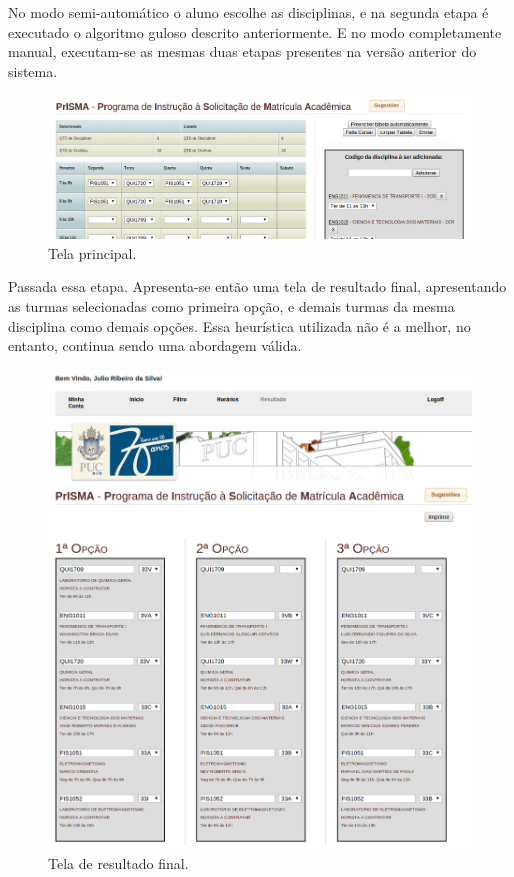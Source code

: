 \documentclass[graduacao,brazil]{ThesisPUC}
\begin{document}
No modo semi-automático o aluno escolhe as disciplinas, e na segunda etapa é executado o algoritmo guloso descrito anteriormente. E no modo completamente manual, executam-se as mesmas duas etapas presentes na versão anterior do sistema.

\begin{figure}[H]
    \centering
    \includegraphics[width=\linewidth]{img/v2_horario.png}
    \caption{Tela principal.}
\end{figure}

Passada essa etapa. Apresenta-se então uma tela de resultado final, apresentando as turmas selecionadas como primeira opção, e demais turmas da mesma disciplina como demais opções. Essa heurística utilizada não é a melhor, no entanto, continua sendo uma abordagem válida.

\begin{figure}[H]
    \centering
    \includegraphics[width=\linewidth]{img/v2_final.png}
    \caption{Tela de resultado final.}
\end{figure}
\end{document}
